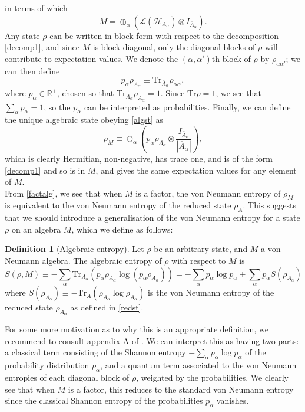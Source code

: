 \documentclass[12pt,a4paper]{report}
\numberwithin{equation}{section}
\newcommand{\ol}[1]{\overline{#1}}
\newcommand{\tr}{\text{Tr}}
\theoremstyle{definition}
\newtheorem{definition}{Definition}[section]
\theoremstyle{theorem}
\theoremstyle{theorem}
\theoremstyle{example}
\theoremstyle{definition}
\begin{document}
in terms of which 
\begin{equation}
	M=\oplus_{\alpha}(\mathcal{L}(\mathcal{H}_{A_{\alpha}})\otimes I_{\ol{A}_{\alpha}}).
\end{equation}
Any state $\rho$ can be written in block form with respect to the decomposition \ref{decomp1}, and since $M$ is block-diagonal, only the diagonal blocks of $\rho$ will contribute to expectation values. We denote the $(\alpha,\alpha')$th block of $\rho$ by $\rho_{\alpha\alpha'}$; we can then define
\begin{equation}\label{redst}
	p_{\alpha}\rho_{A_{\alpha}}\equiv\tr_{\ol{A}_{\alpha}}\rho_{\alpha\alpha},
\end{equation}
where $p_{\alpha}\in\mathbb{R}^{+}$, chosen so that $\tr_{A_{\alpha}}\rho_{A_{\alpha}}=1$. Since $\tr\rho=1$, we see that $\sum_{\alpha}p_{\alpha}=1$, so the $p_{\alpha}$ can be interpreted as probabilities. Finally, we can define the unique algebraic state obeying \ref{algst} as
\begin{equation}
	\rho_{M}\equiv\oplus_{\alpha}\left(p_{\alpha}\rho_{A_{\alpha}}\otimes\frac{I_{\ol{A}_{\alpha}}}{|\ol{A}_{\alpha}|}\right),
\end{equation}
which is clearly Hermitian, non-negative, has trace one, and is of the form \ref{decomp1} and so is in $M$, and gives the same expectation values for any element of $M$.\\
From \ref{factalg}, we see that when $M$ is a factor, the von Neumann entropy of $\rho_{M}$ is equivalent to the von Neumann entropy of the reduced state $\rho_{A}$. This suggests that we should introduce a generalisation of the von Neumann entropy for a state $\rho$ on an algebra $M$, which we define as follows:
\begin{definition}[Algebraic entropy]
	Let $\rho$ be an arbitrary state, and $M$ a von Neumann algebra. The algebraic entropy of $\rho$ with respect to $M$ is
	\begin{equation}
		S(\rho,M)\equiv-\sum_{\alpha}\tr_{A_{\alpha}}(p_{\alpha}\rho_{A_{\alpha}}\log(p_{\alpha}\rho_{A_{\alpha}}))=-\sum_{\alpha}p_{\alpha}\log p_{\alpha}+\sum_{\alpha}p_{\alpha}S(\rho_{A_{\alpha}})
	\end{equation}
	where $S(\rho_{A_{\alpha}})\equiv-\tr_{A}(\rho_{A_{\alpha}}\log\rho_{A_{\alpha}})$ is the von Neumann entropy of the reduced state $\rho_{A_{\alpha}}$ as defined in \ref{redst}.
\end{definition}
For some more motivation as to why this is an appropriate definition, we recommend to consult appendix A of \cite{Harlow}. We can interpret this as having two parts: a classical term consisting of the Shannon entropy $-\sum_{\alpha}p_{\alpha}\log{p_{\alpha}}$ of the probability distribution $p_{\alpha}$, and a quantum term associated to the von Neumann entropies of each diagonal block of $\rho$, weighted by the probabilities. We clearly see that when $M$ is a factor, this reduces to the standard von Neumann entropy since the classical Shannon entropy of the probabilities $p_{\alpha}$ vanishes.\\
\end{document}
